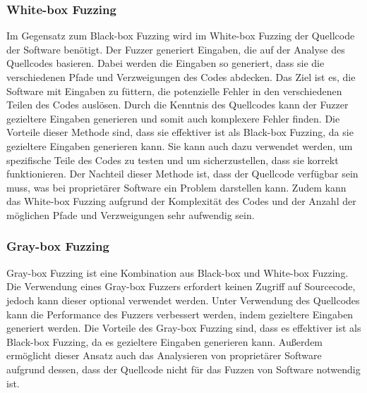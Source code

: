 \subsubsection{White-box Fuzzing}
Im Gegensatz zum Black-box Fuzzing wird im White-box Fuzzing der Quellcode der Software benötigt.
Der Fuzzer generiert Eingaben, die auf der Analyse des Quellcodes basieren.
Dabei werden die Eingaben so generiert, dass sie die verschiedenen Pfade und Verzweigungen des Codes abdecken.
Das Ziel ist es, die Software mit Eingaben zu füttern, die potenzielle Fehler in den verschiedenen Teilen des Codes auslösen.
Durch die Kenntnis des Quellcodes kann der Fuzzer gezieltere Eingaben generieren und somit auch komplexere Fehler finden.
Die Vorteile dieser Methode sind, dass sie effektiver ist als Black-box Fuzzing, da sie gezieltere Eingaben generieren kann.
Sie kann auch dazu verwendet werden, um spezifische Teile des Codes zu testen und um sicherzustellen, dass sie korrekt funktionieren.
Der Nachteil dieser Methode ist, dass der Quellcode verfügbar sein muss, was bei proprietärer Software ein Problem darstellen kann.
Zudem kann das White-box Fuzzing aufgrund der Komplexität des Codes und der Anzahl der möglichen Pfade und Verzweigungen sehr aufwendig sein.
\subsubsection{Gray-box Fuzzing}
Gray-box Fuzzing ist eine Kombination aus Black-box und White-box Fuzzing.
Die Verwendung eines Gray-box Fuzzers erfordert keinen Zugriff auf Sourcecode, jedoch kann dieser optional verwendet werden.
Unter Verwendung des Quellcodes kann die Performance des Fuzzers verbessert werden, indem gezieltere Eingaben generiert werden.
Die Vorteile des Gray-box Fuzzing sind, dass es effektiver ist als Black-box Fuzzing, da es gezieltere Eingaben generieren kann.
Außerdem ermöglicht dieser Ansatz auch das Analysieren von proprietärer Software aufgrund dessen, dass der Quellcode nicht für das
Fuzzen von Software notwendig ist.